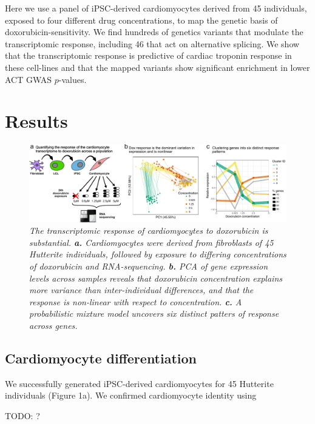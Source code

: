 \documentclass{article}
\begin{document}
{Here we use a panel of iPSC-derived cardiomyocytes derived from 45 individuals, exposed to four different drug concentrations, to map the genetic basis of doxorubicin-sensitivity. We find hundreds of genetics variants that modulate the  transcriptomic response, including 46 that act on alternative splicing. We show that the transcriptomic response is predictive of cardiac troponin response in these cell-lines and that the mapped variants show significant enrichment in lower ACT GWAS $p$-values. 

\section*{Results}

\begin{figure}
\begin{center}
    \includegraphics[width=1\textwidth]{../figures/fig1.pdf} %
    \caption{\it{The transcriptomic response of cardiomyocytes to doxorubicin is substantial. \textbf{a.} Cardiomyocytes were derived from fibroblasts of 45 Hutterite individuals, followed by exposure to differing concentrations of doxorubicin and RNA-sequencing. \textbf{b.} PCA of gene expression levels across samples reveals that doxorubicin concentration explains more variance than inter-individual differences, and that the response is non-linear with respect to concentration. \textbf{c.} A probabilistic mixture model uncovers six distinct patters of response across genes.}}
    \label{fig1}
    \end{center}
\end{figure}

\subsection*{Cardiomyocyte differentiation}

We successfully generated iPSC-derived cardiomyocytes for 45 Hutterite individuals (Figure 1a). We confirmed cardiomyocyte identity using 

TODO: ? 

}
\end{document}

